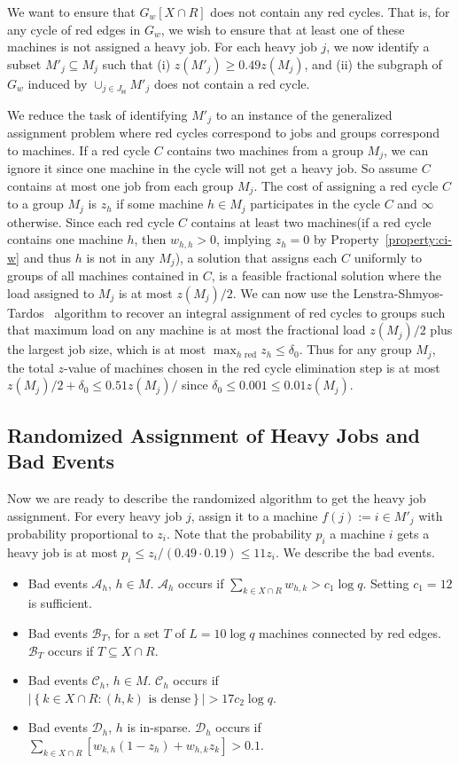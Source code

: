 \documentclass[11pt]{article}
\newcounter{prop}
\newcommand{\set}[1]{\left\{#1\right\}}
\newcommand{\cardinal}[1]{\left|#1\right|}
\newcommand{\cA}{{\mathscr A}}
\newcommand{\cB}{\mathscr{B}}
\newcommand{\cC}{{\mathscr C}}
\newcommand{\cD}{\mathscr{D}}
\newcommand{\sfH}{{\mathsf H}}
\begin{document}
We want to  ensure that $G_w[X \cap R]$ does not contain any red cycles. That is, for any cycle of red edges in $G_w$, we wish to ensure that at least one of these machines is not assigned a heavy job.  For each heavy job $j$, we now identify a subset $M'_j \subseteq M_j$ such that (i) $z(M'_j) \ge 0.49z(M_j)$, and (ii) the subgraph of $G_w$ induced by $\cup_{j \in J_\sfH} M'_j$ does not contain a red cycle. 

We reduce the task of identifying $M'_j$ to an instance of the generalized assignment problem where red cycles correspond to jobs and groups correspond to machines. If a red cycle $C$ contains two machines from a group $M_j$, we can ignore it since one machine in the cycle will not get a heavy job. So assume $C$ contains at most one job from each group $M_j$. The cost of assigning a red cycle $C$ to a group $M_j$ is $z_h$ if some machine $h \in M_j$ participates in the cycle $C$ and $\infty$ otherwise. Since each red cycle $C$ contains at least two machines(if a red cycle contains one machine $h$, then $w_{h,h} > 0$, implying $z_h = 0$ by Property~\ref{property:ci-w} and thus $h$ is not in any $M_j$), a solution that assigns each $C$ uniformly to groups of all machines contained in $C$, is a feasible fractional solution where the load assigned to $M_j$ is at most $z(M_j)/2$. We can now use the Lenstra-Shmyos-Tardos~\cite{LST90} algorithm to recover an integral assignment of red cycles to groups such that maximum load on any machine is at most the fractional load $z(M_j)/2$ plus the largest job size, which is at most $\max_{h\text{ red}}z_h \leq \delta_0$.  Thus for any group $M_j$, the total $z$-value of machines chosen in the red cycle elimination step is at most $z(M_j)/2 + \delta_0 \leq 0.51z(M_j)/$ since $\delta_0 \leq 0.001 \leq 0.01z(M_j)$.

\subsection{Randomized Assignment of Heavy Jobs and Bad Events}
Now we are ready to describe the randomized algorithm to get the heavy job assignment. For every heavy job $j$, assign it to a machine $f(j) := i \in M'_j$ with probability proportional to $z_i$. Note that the probability $p_i$ a machine $i$ gets a heavy job is at most $p_i \leq z_i/(0.49\cdot 0.19) \leq 11z_i$. We describe the bad events.

\begin{itemize}[itemsep=2pt,parsep=2pt]
\item {Bad events $\cA_h$, $h \in M$.} $\cA_h$ occurs if  $\sum_{k\in X\cap R}w_{h,k} > c_1\log q$. Setting $c_1 = 12$ is sufficient.
\item {Bad events $\cB_T$, for a set $T$ of $L=10\log q$ machines connected by red edges.} $\cB_T$ occurs if $T \subseteq X \cap R$.
\item {Bad events $\cC_h$, $h \in M$.} $\cC_h$ occurs if  $\cardinal{\set{k \in X \cap R:(h, k)\text{ is dense}}} > 17c_2\log q$.
\item {Bad events $\cD_h$, $h$ is in-sparse.}  $\cD_h$ 
occurs if $\sum_{k\in X \cap R} [w_{k,h}(1-z_h) + w_{h,k}z_k] > 0.1$.
\end{itemize}
\end{document}
